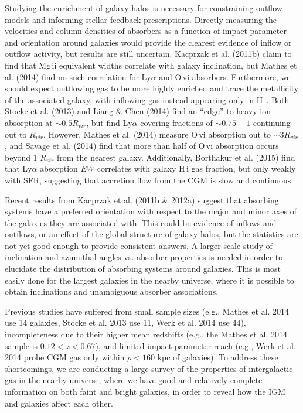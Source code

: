 \documentclass[twocolumn,tighten]{aastex6}
\begin{document}
Studying the enrichment of galaxy halos is necessary for constraining outflow models and informing stellar feedback prescriptions. Directly measuring the velocities and column densities of absorbers as a function of impact parameter and orientation around galaxies would provide the clearest evidence of inflow or outflow activity, but results are still uncertain. Kacprzak et al. (2011b) claim to find that Mg\,{\sc ii} equivalent widths correlate with galaxy inclination, but Mathes et al. (2014) find no such correlation for Ly$\alpha$ and O\,{\sc vi} absorbers. Furthermore, we should expect outflowing gas to be more highly enriched and trace the metallicity of the associated galaxy, with inflowing gas instead appearing only in H\,{\sc i}. Both Stocke et al. (2013) and Liang $\&$ Chen (2014) find an ``edge'' to heavy ion absorption at $\sim0.5R_{vir}$, but find Ly$\alpha$ covering fractions of $\sim0.75-1$ continuing out to $R_{vir}$. However, Mathes et al. (2014) measure O\,{\sc vi} absorption out to $\sim3 R_{vir}$, and Savage et al. (2014) find that more than half of O\,{\sc vi} absorption occurs beyond 1 $R_{vir}$ from the nearest galaxy. Additionally, Borthakur et al. (2015) find that Ly$\alpha$ absorption $EW$ correlates with galaxy H\,{\sc i} gas fraction, but only weakly with SFR, suggesting that accretion flow from the CGM is slow and continuous.

Recent results from Kacprzak et al. (2011b $\&$ 2012a) suggest that absorbing systems have a preferred orientation with respect to the major and minor axes of the galaxies they are associated with. This could be evidence of inflows and outflows, or an effect of the global structure of galaxy halos, but the statistics are not yet good enough to provide consistent answers. A larger-scale study of inclination and azimuthal angles vs. absorber properties is needed in order to elucidate the distribution of absorbing systems around galaxies. This is most easily done for the largest galaxies in the nearby universe, where it is possible to obtain inclinations and unambiguous absorber associations. 

Previous studies have suffered from small sample sizes (e.g., Mathes et al. 2014 use 14 galaxies, Stocke et al. 2013 use 11, Werk et al. 2014 use 44), incompleteness due to their higher mean redshifts (e.g., the Mathes et al. 2014 sample is $0.12 <z<0.67$), and limited impact parameter reach (e.g., Werk et al. 2014 probe CGM gas only within $\rho < 160$ kpc of galaxies). To address these shortcomings, we are conducting a large survey of the properties of intergalactic gas in the nearby universe, where we have good and relatively complete information on both faint and bright galaxies, in order to reveal how the IGM and galaxies affect each other. 
\end{document}
